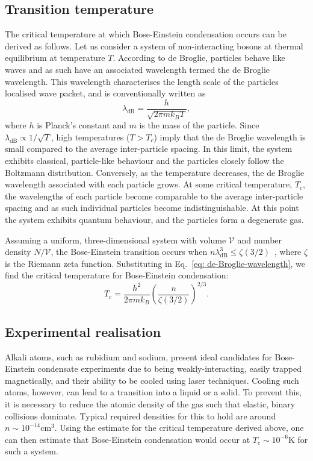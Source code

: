 \subsection{Transition temperature}
The critical temperature at which Bose-Einstein condensation occurs can be
derived as follows.
Let us consider a system of non-interacting bosons at thermal equilibrium at
temperature \(T\).
According to de Broglie, particles behave like waves and as such have an
associated wavelength termed the de Broglie wavelength.
This wavelength characterises the length scale of the particles localised
wave packet, and is conventionally written as
\begin{equation}\label{eq: de-Broglie-wavelength}
    \lambda_\text{dB} = \frac{h}{\sqrt{2\pi mk_B T}},
\end{equation}
where \(h\) is Planck's constant and \(m\) is the mass of the particle.
Since \(\lambda_\text{dB} \propto 1 / \sqrt{T}\), high temperatures
(\(T > T_c\)) imply that the de Broglie wavelength is small compared to the
average inter-particle spacing.
In this limit, the system exhibits classical, particle-like behaviour and the
particles closely follow the Boltzmann distribution.
Conversely, as the temperature decreases, the de Broglie wavelength associated
with each particle grows.
At some critical temperature, \(T_c\), the wavelengths of each particle become
comparable to the average inter-particle spacing and as such individual
particles become indistinguishable.
At this point the system exhibits quantum behaviour, and the particles form a
degenerate gas.

Assuming a uniform, three-dimensional system with volume \(\mathcal{V}\) and
number density \(N/\mathcal{V}\), the Bose-Einstein transition occurs when
\(n\lambda_{\text{dB}}^3 \leq \zeta(3/2)\)~\cite{Pethick2008}, where
\(\zeta \) is the Riemann zeta function.
Substituting in Eq.~\eqref{eq: de-Broglie-wavelength}, we find the critical
temperature for Bose-Einstein condensation:
\begin{equation}
    T_c = \frac{h^2}{2\pi mk_B}{\left(\frac{n}{\zeta(3/2)}\right)}^{2/3}.
\end{equation}

\subsection{Experimental realisation}
Alkali atoms, such as rubidium and sodium, present ideal candidates
for Bose-Einstein condensate experiments due to being weakly-interacting, easily
trapped magnetically, and their ability to be cooled using laser techniques.
Cooling such atoms, however, can lead to a transition into a liquid or a solid.
To prevent this, it is necessary to reduce the atomic density of the gas such
that elastic, binary collisions dominate.
Typical required densities for this to hold are around \(n \sim 10^{-14}
\text{cm}^3\).
Using the estimate for the critical temperature derived above, one can then
estimate that Bose-Einstein condensation would occur at \(T_c \sim 10^{-6}\)K
for such a system.

